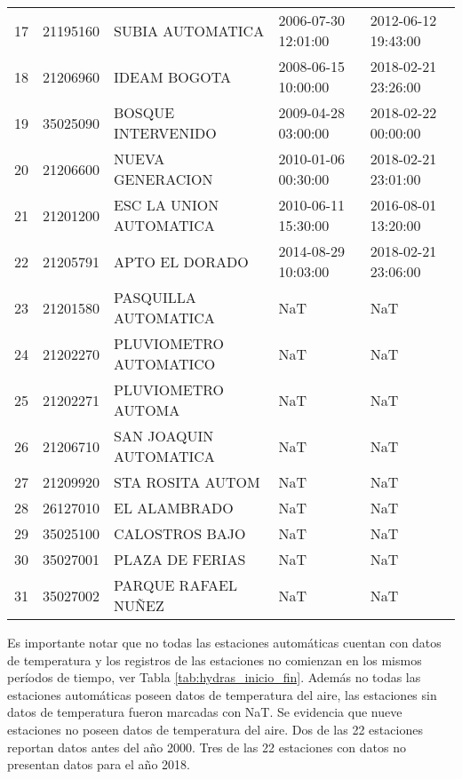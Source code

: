 \begin{table}[h]
\begin{tabular}{lrlll}
17 &  21195160 &         SUBIA AUTOMATICA & 2006-07-30 12:01:00 & 2012-06-12 19:43:00 \\
18 &  21206960 &             IDEAM BOGOTA & 2008-06-15 10:00:00 & 2018-02-21 23:26:00 \\
19 &  35025090 &       BOSQUE INTERVENIDO & 2009-04-28 03:00:00 & 2018-02-22 00:00:00 \\
20 &  21206600 &         NUEVA GENERACION & 2010-01-06 00:30:00 & 2018-02-21 23:01:00 \\
21 &  21201200 &  ESC LA UNION AUTOMATICA & 2010-06-11 15:30:00 & 2016-08-01 13:20:00 \\
22 &  21205791 &           APTO EL DORADO & 2014-08-29 10:03:00 & 2018-02-21 23:06:00 \\
23 &  21201580 &     PASQUILLA AUTOMATICA &                 NaT &                 NaT \\
24 &  21202270 &   PLUVIOMETRO AUTOMATICO &                 NaT &                 NaT \\
25 &  21202271 &       PLUVIOMETRO AUTOMA &                 NaT &                 NaT \\
26 &  21206710 &   SAN JOAQUIN AUTOMATICA &                 NaT &                 NaT \\
27 &  21209920 &         STA ROSITA AUTOM &                 NaT &                 NaT \\
28 &  26127010 &             EL ALAMBRADO &                 NaT &                 NaT \\
29 &  35025100 &           CALOSTROS BAJO &                 NaT &                 NaT \\
30 &  35027001 &          PLAZA DE FERIAS &                 NaT &                 NaT \\
31 &  35027002 &      PARQUE RAFAEL NUÑEZ &                 NaT &                 NaT \\
\bottomrule
\end{tabular}
\end{table}

Es importante notar que no todas las estaciones automáticas cuentan con datos de temperatura y los registros de las estaciones no comienzan en los mismos períodos de tiempo, ver Tabla \ref{tab:hydras_inicio_fin}. Además no todas las estaciones automáticas poseen datos de temperatura del aire, las estaciones sin datos de temperatura fueron marcadas con NaT. Se evidencia que nueve estaciones no poseen datos de temperatura del aire. Dos de las 22 estaciones reportan datos antes del año 2000. Tres de las 22 estaciones con datos no presentan datos para el año 2018.\\

